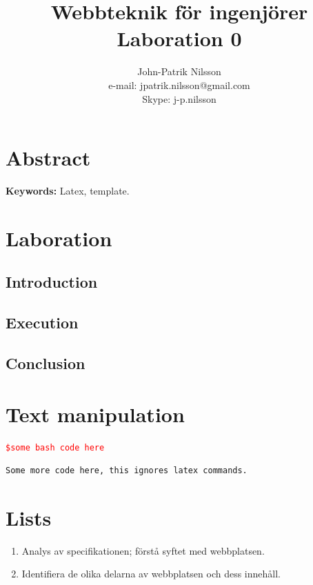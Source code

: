 \documentclass[a4paper,10pt]{article}
\title{Webbteknik för ingenjörer \\
	Laboration 0}
\author{John-Patrik Nilsson \\
	e-mail: jpatrik.nilsson@gmail.com \\
	Skype: j-p.nilsson}
\begin{document}
\maketitle

\pagestyle{empty}
\thispagestyle{empty}

\section{Abstract}

\textbf{Keywords:} Latex, template.

\section{Laboration}
\subsection{Introduction}

\subsection{Execution}

\subsection{Conclusion}

\appendix
\section{Text manipulation}
\textcolor{red}{\texttt{\$some bash code here}}

\begin{verbatim}
Some more code here, this ignores latex commands.
\end{verbatim}

\section{Lists}
\begin{enumerate}
	\item Analys av specifikationen; förstå syftet med webbplatsen.
	\item Identifiera de olika delarna av webbplatsen och dess innehåll.
\end{enumerate}
\end{document}
